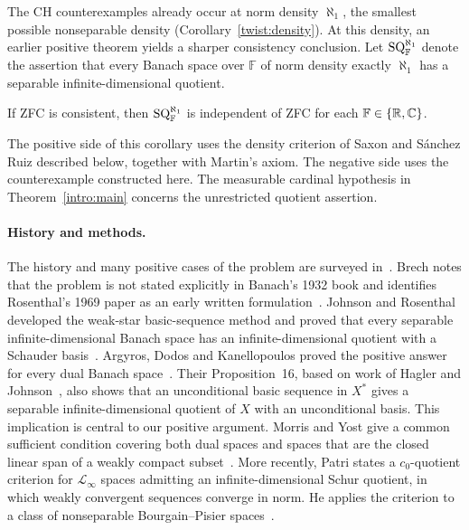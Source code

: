 The CH counterexamples already occur at norm density $\aleph_1$, the
smallest possible nonseparable density (Corollary~\ref{twist:density}).
At this density, an earlier positive theorem yields a sharper consistency
conclusion. Let $\mathrm{SQ}^{\aleph_1}_{\mathbb F}$ denote the assertion that
every Banach space over $\mathbb F$ of norm density exactly $\aleph_1$
has a separable infinite-dimensional quotient.

\begin{corollary}\label{intro:small-density}
If ZFC is consistent, then $\mathrm{SQ}^{\aleph_1}_{\mathbb F}$ is independent
of ZFC for each $\mathbb F\in\{\mathbb R,\mathbb C\}$.
\end{corollary}

The positive side of this corollary uses the density criterion of Saxon
and S\'anchez Ruiz described below, together with Martin's axiom. The
negative side uses the counterexample constructed here. The measurable
cardinal hypothesis in Theorem~\ref{intro:main} concerns the unrestricted
quotient assertion.

\paragraph{History and methods.}
The history and many positive cases of the problem are surveyed
in~\cite{Brech2025,FerrandoKakolLopezPellicerSliwa2018}.
Brech notes that the problem is not stated explicitly in Banach's 1932
book and identifies Rosenthal's 1969 paper as an early written
formulation~\cite[p.~74]{Brech2025}.
Johnson and Rosenthal developed the weak-star basic-sequence method and
proved that every separable infinite-dimensional Banach space has an
infinite-dimensional quotient with a Schauder
basis~\cite{JohnsonRosenthal1972}.
Argyros, Dodos and Kanellopoulos proved the positive answer for every dual
Banach space~\cite[Theorem~15]{ArgyrosDodosKanellopoulos2008}.
Their Proposition~16, based on work of Hagler and
Johnson~\cite{HaglerJohnson1977}, also shows that an unconditional basic
sequence in $X^*$ gives a separable infinite-dimensional quotient of $X$
with an unconditional basis. This implication is central to our positive
argument. Morris and Yost give a common sufficient condition covering
both dual spaces and spaces that are the closed linear span of a weakly
compact subset~\cite{MorrisYost2020}.
More recently, Patri states a $c_0$-quotient criterion for
$\mathcal L_\infty$ spaces admitting an infinite-dimensional Schur
quotient, in which weakly convergent sequences converge in norm.
He applies the criterion to a class of nonseparable Bourgain--Pisier spaces~\cite{Patri2026}.

